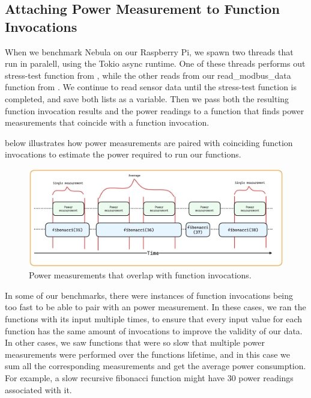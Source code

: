 \documentclass[
  table]{report}
\begin{document}
\subsection{Attaching Power Measurement to Function Invocations}

When we benchmark Nebula on our Raspberry Pi, we spawn two threads that
run in paralell, using the Tokio async runtime. One of these threads
performs out stress-test function from , while
the other reads from our read\_modbus\_data function from
. We continue to read sensor data until the
stress-test function is completed, and save both lists as a variable.
Then we pass both the resulting function invocation results and the
power readings to a function that finds power measurements that coincide
with a function invocation.

 below illustrates how power
measurements are paired with coinciding function invocations to estimate
the power required to run our functions.

\begin{figure}[H]
\centering
  \includegraphics{assets/6-power_measurements}
  \caption{Power measurements that overlap with function invocations.}
  \label{fig:power_measurement_timeline}
\end{figure}

In some of our benchmarks, there were instances of function invocations
being too fast to be able to pair with an power measurement. In these
cases, we ran the functions with its input multiple times, to ensure
that every input value for each function has the same amount of
invocations to improve the validity of our data. In other cases, we saw
functions that were so slow that multiple power measurements were
performed over the functions lifetime, and in this case we sum all the
corresponding measurements and get the average power consumption. For
example, a slow recursive fibonacci function might have 30 power
readings associated with it.
\end{document}
